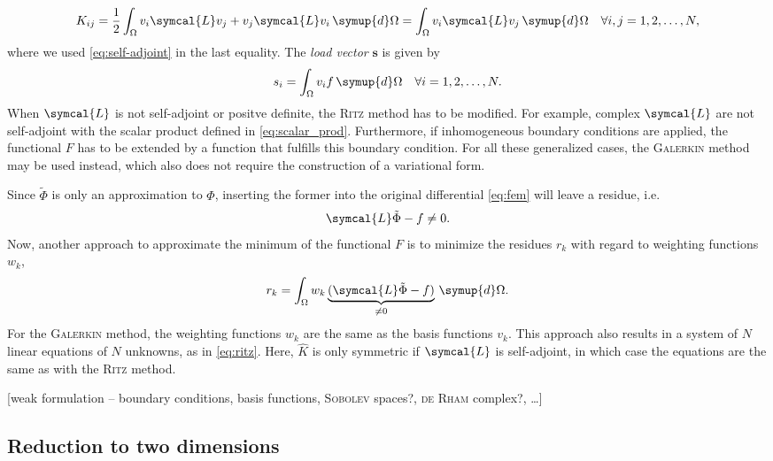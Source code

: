 \documentclass[a4paper, twoside, 10pt, english]{article}
\numberwithin{equation}{section}
\let\vec\symbf
\begin{document}
\begin{gather}
  K_{ij} = \frac{1}{2} \int_{\Omega} v_{i} \symcal{L} v_{j} + v_{j} \symcal{L} v_{i} \, \symup{d} \Omega = \int_{\Omega} v_{i} \symcal{L} v_{j} \, \symup{d} \Omega \quad \forall i, j = 1, 2, \dotsc, N,
\end{gather}
where we used \cref{eq:self-adjoint} in the last equality. The \emph{load vector} $\vec{s}$ is given by
\begin{gather}
  s_{i} = \int_{\Omega} v_{i} f \, \symup{d} \Omega \quad \forall i = 1, 2, \dotsc, N.
\end{gather}
When $\symcal{L}$ is not self-adjoint or positve definite, the \textsc{Ritz} method has to be modified. For example, complex $\symcal{L}$ are not self-adjoint with the scalar product defined in \cref{eq:scalar_prod}. Furthermore, if inhomogeneous boundary conditions are applied, the functional $F$ has to be extended by a function that fulfills this boundary condition. For all these generalized cases, the \textsc{Galerkin} method may be used instead, which also does not require the construction of a variational form.

Since $\tilde{\Phi}$ is only an approximation to $\Phi$, inserting the former into the original differential \cref{eq:fem} will leave a residue, i.e.
\begin{gather}
  \symcal{L} \tilde{\Phi} - f \neq 0.
\end{gather}
Now, another approach to approximate the minimum of the functional $F$ is to minimize the residues $r_{k}$ with regard to weighting functions $w_{k}$,
\begin{gather}
  r_{k} = \int_{\Omega} w_{k} \underbrace{(\symcal{L} \tilde{\Phi} - f)}_{\neq 0} \, \symup{d} \Omega.
\end{gather}
For the \textsc{Galerkin} method, the weighting functions $w_{k}$ are the same as the basis functions $v_{k}$. This approach also results in a system of $N$ linear equations of $N$ unknowns, as in \cref{eq:ritz}. Here, $\hat{K}$ is only symmetric if $\symcal{L}$ is self-adjoint, in which case the equations are the same as with the \textsc{Ritz} method.

[weak formulation -- boundary conditions, basis functions, \textsc{Sobolev} spaces?, \textsc{de Rham} complex?, \ldots]

\subsection{Reduction to two dimensions}
\label{sec:fourier-fem}
\end{document}
